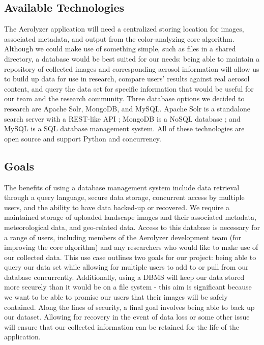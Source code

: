 \documentclass[letterpaper,10pt,draftclsnofoot,onecolumn]{IEEEtran}
\begin{document}
\begin{flushleft}
\subsection{Available Technologies}
The Aerolyzer application will need a centralized storing location for images, associated metadata, and output from the color-analyzing core algorithm. Although we could make use of something simple, such as files in a shared directory, a database would be best suited for our needs: being able to maintain a repository of collected images and corresponding aerosol information will allow us to build up data for use in research, compare users’ results against real aerosol content, and query the data set for specific information that would be useful for our team and the research community. Three database options we decided to research are Apache Solr, MongoDB, and MySQL. Apache Solr is a standalone search server with a REST-like API \cite{5}; MongoDB is a NoSQL database \cite{6}; and MySQL is a SQL database management system\cite{7}. All of these technologies are open source and support Python and concurrency. \cite{8}



\subsection{Goals}
The benefits of using a database management system include data retrieval through a query language, secure data storage, concurrent access by multiple users, and the ability to have data backed-up or recovered. We require a maintained storage of uploaded landscape images and their associated metadata, meteorological data, and geo-related data. Access to this database is necessary for a range of users, including members of the Aerolyzer development team (for improving the core algorithm) and any researchers who would like to make use of our collected data. This use case outlines two goals for our project: being able to query our data set while allowing for multiple users to add to or pull from our database concurrently. Additionally, using a DBMS will keep our data stored more securely than it would be on a file system - this aim is significant because we want to be able to promise our users that their images will be safely contained. Along the lines of security, a final goal involves being able to back up our dataset. Allowing for recovery in the event of data loss or some other issue will ensure that our collected information can be retained for the life of the application.




\end{flushleft}
\end{document}
